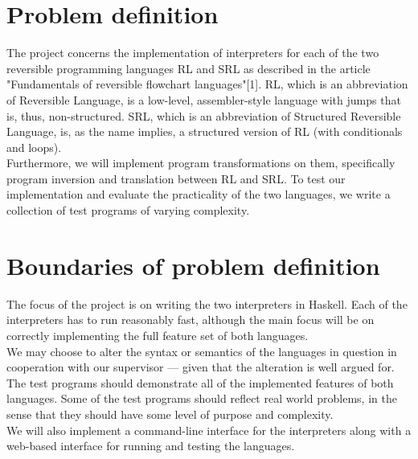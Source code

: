 \section*{Problem definition}
\label{sec:problem_definition}
The project concerns the implementation of interpreters for each of the two reversible programming languages RL and SRL as described in the article "Fundamentals of reversible flowchart languages"[1]. RL, which is an abbreviation of Reversible Language, is a low-level, assembler-style language with jumps that is, thus, non-structured. SRL, which is an abbreviation of Structured Reversible Language, is, as the name implies, a structured version of RL (with conditionals and loops). \\
\indent Furthermore, we will implement program transformations on them, specifically program inversion and translation between RL and SRL. %
To test our implementation and evaluate the practicality of the two languages, we write a collection of test programs of varying complexity.

\section*{Boundaries of problem definition}
\label{sec:boundaries_of_problem_definition}

The focus of the project is on writing the two interpreters in Haskell. Each of the interpreters has to run reasonably fast, although the main focus will be on correctly implementing the full feature set of both languages. \\
\indent We may choose to alter the syntax or semantics of the languages in question in cooperation with our supervisor --- given that the alteration is well argued for. \\
\indent The test programs should demonstrate all of the implemented features of both languages. Some of the test programs should reflect real world problems, in the sense that they should have some level of purpose and complexity. \\
\indent We will also implement a command-line interface for the interpreters along with a web-based interface for running and testing the languages.

